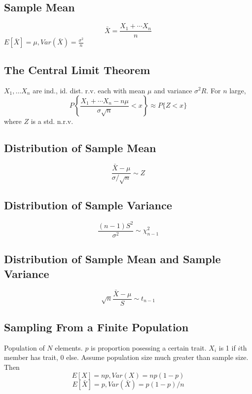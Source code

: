 \subsection{Sample Mean}
$$\bar{X} = \frac{X_1 + \cdots X_n}{n}$$
$E[\bar{X}] = \mu, Var(\bar{X}) = \frac{\sigma^2}{n}$
\subsection{The Central Limit Theorem}
$X_1,\ldots X_n$ are ind., id. dist. r.v. each with mean
$\mu$ and variance $\sigma^2R$\@. For $n$ large,
$$P\left\{\frac{X_1+\cdots X_n -n\mu}{\sigma \sqrt{n}} < x \right\} \approx P\{Z<x\}$$ where $Z$ is a std. n.r.v\@.
\subsection{Distribution of Sample Mean}
$$\frac{\bar{X}-\mu}{\sigma/\sqrt{n}} \sim Z$$
\subsection{Distribution of Sample Variance}
$$\frac{(n-1)S^2}{\sigma^2} \sim \chi_{n-1}^2$$
\subsection{Distribution of Sample Mean and Sample Variance}
$$\sqrt{n}\frac{\bar{X}-\mu}{S} \sim t_{n-1}$$
\subsection{Sampling From a Finite Population}
Population of $N$ elements. $p$ is proportion posessing a
certain trait. $X_i$ is 1 if $i$th member has trait, 0 else.
Assume population size much greater than sample size. Then
$$E[X] = np, Var(X) = np(1-p)$$
$$E[\bar{X}]=p, Var(\bar{X})=p(1-p)/n$$
